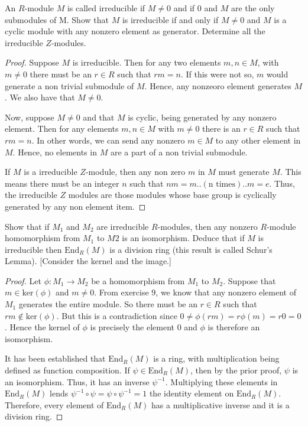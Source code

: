 \documentclass[10pt]{article}
\newenvironment{problem}[2][Problem]{\begin{trivlist}
		\item[\hskip \labelsep {\bfseries #1}\hskip \labelsep {\bfseries #2.}]}{\end{trivlist}}
\begin{document}
	\begin{problem}{3.9}
		An $R$-module $M$ is called irreducible if $M \not = 0$ and if $0$ and $M$ are the only submodules of M. Show that $M$ is irreducible if and only if $M \not= 0$ and $M$ is a cyclic module with any nonzero element as generator. Determine all the irreducible $Z$-modules.
		\begin{proof}
			Suppose $M$ is irreducible. Then for any two elements $m, n \in M$, with $m\not= 0$ there must be an $r \in R$ such that $rm = n$. If this were not so, $m$ would generate a non trivial submodule of $M$. Hence, any nonzeoro element generates $M$. We also have that $M\not=0$.
			
			Now, suppose $M \not = 0$ and that $M$ is cyclic, being generated by any nonzero element. Then for any elements $m, n \in M$ with $m \not= 0$ there is an $r \in R$ such that $rm=n$. In other words, we can send any nonzero $m \in M$ to any other element in $M$. Hence, no elements in $M$ are a part of a non trivial submodule.
			
			If $M$ is a irreducible $Z$-module, then any non zero $m$ in $M$ must generate $M$. This means there must be an integer $n$ such that $nm = m..(\text{n times})..m =e$. Thus, the irreducible $Z$ modules are those modules whose base group is cyclically generated by any non element item. 
		\end{proof}
	\end{problem}
	
	\begin{problem}{3.11}
		Show that if $M_1$ and $M_2$ are irreducible $R$-modules, then any nonzero $R$-module homomorphism from $M_1$ to $M2$ is an isomorphism. Deduce that if $M$ is irreducible then $\text{End}_R(M)$ is a division ring (this result is called Schur's Lemma). [Consider the kernel and the image.]
		\begin{proof}
			Let $\phi : M_1 \rightarrow M_2$ be a homomorphism from $M_1$ to $M_2$. Suppose that $m \in \text{ker}(\phi)$ and $m \not = 0$. From exercise 9, we know that any nonzero element of $M_1$ generates the entire module. So there must be an $r \in R$ such that $rm \not \in \text{ker}(\phi)$. But this is a contradiction since $0 \not = \phi(rm) = r\phi(m) = r0 = 0$. Hence the kernel of $\phi$ is precisely the element $0$ and $\phi$ is therefore an isomorphism.
			
			It has been established that $\text{End}_R(M)$ is a ring, with multiplication being defined as function composition. If $\psi \in \text{End}_R(M)$, then by the prior proof, $\psi$ is an isomorphism. Thus, it has an inverse $\psi^{-1}$. Multiplying these elements in $\text{End}_R(M)$ lends $\psi^{-1}\circ\psi =\psi\circ\psi^{-1} = 1$ the identity element on $\text{End}_R(M)$. Therefore, every element of $\text{End}_R(M)$ has a multiplicative inverse and it is a division ring.
		\end{proof}
	\end{problem}
	
\end{document}
